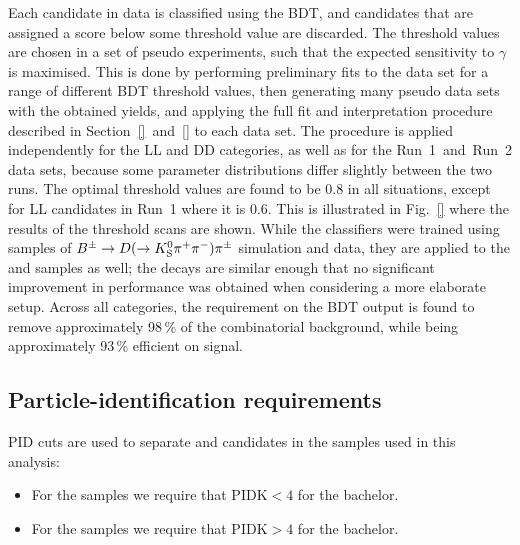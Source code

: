 Each candidate in data is classified using the BDT, and candidates that are assigned a score below some threshold value are discarded. The threshold values are chosen in a set of pseudo experiments, such that the expected sensitivity to $\gamma$ is maximised. This is done by performing preliminary fits to the data set for a range of different BDT threshold values, then generating many pseudo data sets with the obtained yields, and applying the full fit and interpretation procedure described in Section~\ref{}~and~\ref{} to each data set. The procedure is applied independently for the LL and DD categories, as well as for the Run~1~and~Run~2 data sets, because some parameter distributions differ slightly between the two runs. The optimal threshold values are found to be 0.8 in all situations, except for LL candidates in Run~1 where it is 0.6. This is illustrated in Fig.~\ref{} where the results of the threshold scans are shown. While the classifiers were trained using samples of ${{B}^\pm}\rightarrow{\ensuremath{D}}(\rightarrow{\ensuremath{{K}^0_{\mathrm{S}}}}{\ensuremath{{\pi}^+}}{\ensuremath{{\pi}^-}}){{\pi}^\pm}$ simulation and data, they are applied to the \BtoDK and \DtoKsKK samples as well; the decays are similar enough that no significant improvement in performance was obtained when considering a more elaborate setup. Across all categories, the requirement on the BDT output is found to remove approximately 98\,\% of the combinatorial background, while being approximately 93\,\% efficient on signal.




\subsection{Particle-identification requirements} %
\label{sub:particle_identification_requirements}

PID cuts are used to separate \BtoDK and \BtoDpi candidates in the samples used in this analysis: 
\begin{itemize}
\item For the \BtoDpiDtoKshh samples we require that $\textrm{PIDK} < 4$ for the bachelor.
\item For the \BtoDKDtoKshh samples we require that $\textrm{PIDK} > 4$ for the bachelor. 
\end{itemize}


